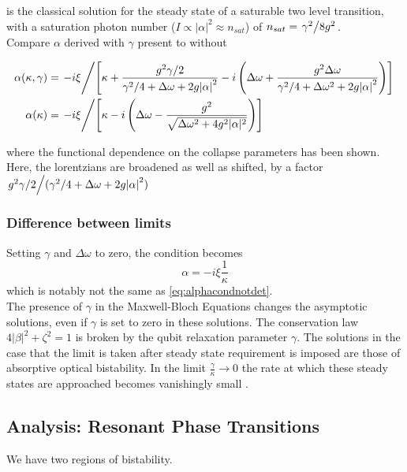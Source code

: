  is the classical solution for the steady state of a saturable two level transition, with a saturation photon number ($I \propto |\alpha|^2 \approx n_{sat}$) of $n_{sat} = \flatfrac{\gamma^2}{8g^2}$.  \\
Compare $\alpha$ derived with $\gamma$ present to without
\begin{widetext}
  \begin{align}
    \alpha(\kappa, \gamma) &= \flatfrac{-i\xi}{\left[ \kappa + \frac{g^2\gamma/2}{\gamma^2/4+\Delta\omega+2g\abs{\alpha}^2} - i\left( \Delta\omega+\frac{g^2\Delta\omega}{\gamma^2/4+\Delta\omega^2 + 2g\abs{\alpha}^2}\right)\right]}\\
            \alpha(\kappa) &= \flatfrac{-i\xi}{\left[\kappa-i\left(\Delta \omega - \frac{g^2}{\sqrt{\Delta \omega^2 +4g^2 |\alpha|^2}}\right)\right]}
  \end{align}
\end{widetext}
where the functional dependence on the collapse parameters has been shown.
Here, the lorentzians are broadened as well as shifted, by a factor $\flatfrac{g^2\gamma/2}{(\gamma^2/4+\Delta\omega + 2g\abs{\alpha}^2)}$
\subsubsection{Difference between limits}
Setting $\gamma$ and $\Delta\omega$ to zero, the condition becomes
\begin{equation}
  \alpha = -i\xi\frac{1}{\kappa}
\end{equation}
which is notably not the same as \cref{eq:alphacondnotdet}.\\

The presence of $\gamma$ in the Maxwell-Bloch Equations changes the asymptotic solutions, even if $\gamma$ is set to zero in these solutions.
The conservation law $4|\beta|^2 +\zeta^2 = 1$ is broken by the qubit relaxation parameter $\gamma$.
The solutions in the case that the limit is taken after steady state requirement is imposed are those of absorptive optical bistability.
In the limit $\frac{\gamma}{\kappa} \rightarrow 0$ the rate at which these steady states are approached becomes vanishingly small
 \cite{Alsing1990}.
 \subsection{Analysis: Resonant Phase Transitions}
We have two regions of bistability.
